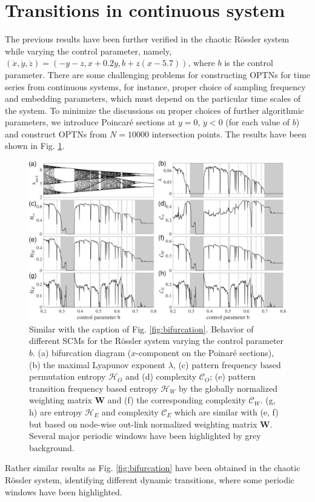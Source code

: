 \documentclass[12pt,aip,cha,reprint,nofootinbib]{revtex4-1}
\begin{document}
\section{Transitions in continuous system}
The previous results have been further verified in the chaotic R\"ossler system \cite{Roessler1976} while varying the control parameter, namely, $(\dot{x}, \dot{y}, \dot{z}) = (-y-z, x+0.2y, b+z(x-5.7))$, where $b$ is the control parameter. There are some challenging problems for constructing OPTNs for time series from continuous systems, for instance, proper choice of sampling frequency and embedding parameters, which must depend on the particular time scales of the system. To minimize the discussions on proper choices of further algorithmic parameters, we introduce Poincar\'e sections at $y=0$, $\dot{y}<0$ (for each value of $b$) and construct OPTNs from $N = 10000$ intersection points. The results have been shown in Fig. \ref{fig:bifurRossler}. 
\begin{figure}
	\centering 
	\includegraphics[width=2\columnwidth]{rosslerEntropy.pdf}
\caption{\small{Similar with the caption of Fig. \ref{fig:bifurcation}. Behavior of different SCMs for the R\"ossler system varying the control parameter $b$. (a) bifurcation diagram ($x$-component on the Poinar\'e sections), (b) the maximal Lyapunov exponent $\lambda$, (c) pattern frequency based permutation entropy $\mathcal{H}_O$ and (d) complexity $\mathcal{C}_O$; (e) pattern transition frequency based entropy $\mathcal{H}_W$ by the globally normalized weighting matrix $\mathbf{W}$ and (f) the corresponding complexity $\mathcal{C}_W$. (g, h) are entropy $\mathcal{H}_E$ and complexity $\mathcal{C}_E$ which are similar with (e, f) but based on node-wise out-link normalized weighting matrix $\mathbf{W}$. Several major periodic windows have been highlighted by grey background. } \label{fig:bifurRossler}}
\end{figure}
Rather similar results as Fig. \ref{fig:bifurcation} have been obtained in the chaotic R\"ossler system, identifying different dynamic transitions, where some periodic windows have been highlighted. 
\end{document}
